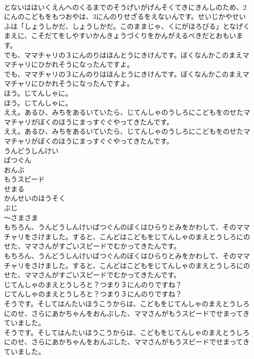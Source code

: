\documentclass[8pt]{extreport}
\begin{document}
\begin{CJK}{UTF8}{min}
\\	とないはほいくえんへのくるまでのそうげいがげんそくてきにきんしのため、2にんのこどもをもつおやは、3にんのりせざるをえないんです。せいじかやせいふは「しょうしかだ、しょうしかだ。このままじゃ、くにがほろびる」となげくまえに、こそだてをしやすいかんきょうづくりをかんがえるべきだとおもいます。
\\	でも、ママチャリの３にんのりはほんとうにきけんです。ぼくなんかこのまえママチャリにひかれそうになったんですよ。
\\	でも、ママチャリの３にんのりはほんとうにきけんです。ぼくなんかこのまえママチャリにひかれそうになったんですよ。
\\	ほう。じてんしゃに。
\\	ほう。じてんしゃに。
\\	ええ。あるひ、みちをあるいていたら、じてんしゃのうしろにこどもをのせたママチャリがぼくのほうにまっすぐぐやってきたんです。
\\	ええ。あるひ、みちをあるいていたら、じてんしゃのうしろにこどもをのせたママチャリがぼくのほうにまっすぐぐやってきたんです。
\\	うんどうしんけい
\\	ばつぐん
\\	おんぶ
\\	もうスピード
\\	せまる
\\	かんせいのほうそく
\\	ぶじ
\\	～さまさま
\\	もちろん、うんどうしんけいばつぐんのぼくはひらりとみをかわして、そのママチャリをさけました。すると、こんどはこどもをじてんしゃのまえとうしろにのせた、ママさんがすごいスピードでむかってきたんです。
\\	もちろん、うんどうしんけいばつぐんのぼくはひらりとみをかわして、そのママチャリをさけました。すると、こんどはこどもをじてんしゃのまえとうしろにのせた、ママさんがすごいスピードでむかってきたんです。
\\	じてんしゃのまえとうしろと？つまり３にんのりですね？
\\	じてんしゃのまえとうしろと？つまり３にんのりですね？
\\	そうです。そしてはんたいほうこうからは、こどもをじてんしゃのまえとうしろにのせ、さらにあかちゃんをおんぶした、ママさんがもうスピードでせまってきていました。
\\	そうです。そしてはんたいほうこうからは、こどもをじてんしゃのまえとうしろにのせ、さらにあかちゃんをおんぶした、ママさんがもうスピードでせまってきていました。

\end{CJK}
\end{document}
